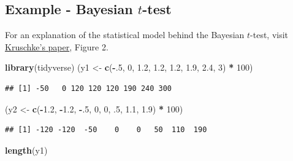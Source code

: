 \documentclass[
]{book}
\newenvironment{Shaded}{\begin{snugshade}}{\end{snugshade}}
\newcommand{\DecValTok}[1]{\textcolor[rgb]{0.00,0.00,0.81}{#1}}
\newcommand{\FloatTok}[1]{\textcolor[rgb]{0.00,0.00,0.81}{#1}}
\newcommand{\FunctionTok}[1]{\textcolor[rgb]{0.13,0.29,0.53}{\textbf{#1}}}
\newcommand{\NormalTok}[1]{#1}
\newcommand{\OtherTok}[1]{\textcolor[rgb]{0.56,0.35,0.01}{#1}}
\newcommand{\SpecialCharTok}[1]{\textcolor[rgb]{0.81,0.36,0.00}{\textbf{#1}}}
\begin{document}
\subsection{\texorpdfstring{Example - Bayesian \(t\)-test}{Example - Bayesian t-test}}\label{example---bayesian-t-test}

For an explanation of the statistical model behind the Bayesian \(t\)-test,
visit \href{https://gwern.net/doc/statistics/bayes/2012-kruschke.pdf}{Kruschke's paper}, Figure 2.

\begin{Shaded}
\begin{Highlighting}[]
\FunctionTok{library}\NormalTok{(tidyverse)}
\NormalTok{(y1 }\OtherTok{\textless{}{-}} \FunctionTok{c}\NormalTok{(}\SpecialCharTok{{-}}\NormalTok{.}\DecValTok{5}\NormalTok{, }\DecValTok{0}\NormalTok{, }\FloatTok{1.2}\NormalTok{, }\FloatTok{1.2}\NormalTok{, }\FloatTok{1.2}\NormalTok{, }\FloatTok{1.9}\NormalTok{, }\FloatTok{2.4}\NormalTok{, }\DecValTok{3}\NormalTok{) }\SpecialCharTok{*} \DecValTok{100}\NormalTok{)}
\end{Highlighting}
\end{Shaded}

\begin{verbatim}
## [1] -50   0 120 120 120 190 240 300
\end{verbatim}

\begin{Shaded}
\begin{Highlighting}[]
\NormalTok{(y2 }\OtherTok{\textless{}{-}} \FunctionTok{c}\NormalTok{(}\SpecialCharTok{{-}}\FloatTok{1.2}\NormalTok{, }\SpecialCharTok{{-}}\FloatTok{1.2}\NormalTok{, }\SpecialCharTok{{-}}\NormalTok{.}\DecValTok{5}\NormalTok{, }\DecValTok{0}\NormalTok{, }\DecValTok{0}\NormalTok{, .}\DecValTok{5}\NormalTok{, }\FloatTok{1.1}\NormalTok{, }\FloatTok{1.9}\NormalTok{) }\SpecialCharTok{*} \DecValTok{100}\NormalTok{)}
\end{Highlighting}
\end{Shaded}

\begin{verbatim}
## [1] -120 -120  -50    0    0   50  110  190
\end{verbatim}

\begin{Shaded}
\begin{Highlighting}[]
\FunctionTok{length}\NormalTok{(y1)}
\end{Highlighting}
\end{Shaded}
\end{document}
